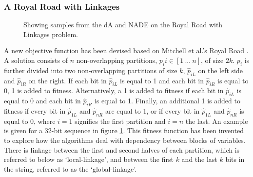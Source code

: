 \documentclass[twoside]{article}
\begin{document}
\subsubsection{A Royal Road with Linkages}
\begin{figure}[t!]
\centering
{}
\caption[Optional caption for list of figures]{Showing samples from the dA and NADE on the Royal Road with Linkages problem.}
  \label{fig:churchillroadexample}
\end{figure}


A new objective function has been devised based on Mitchell et al.'s Royal Road \citep{mitchell1992royal}. A solution consists of \(n\) non-overlapping partitions, \(p_i i\in{[1\ ... \ n]}\), of size \(2k\). \(p_i\) is further divided into two non-overlapping partitions of size \(k\), \(\hat{p}_{iL}\) on the left side and \(\hat{p}_{iR}\) on the right. If each bit in \(\hat{p}_{iL}\) is equal to 1 and each bit in \(\hat{p}_{iR}\) is equal to 0, 1 is added to fitness. Alternatively, a 1 is added to fitness if each bit in \(\hat{p}_{iL}\) is equal to 0 and each bit in \(\hat{p}_{iR}\) is equal to 1. Finally, an additional 1 is added to fitness if every bit in \(\hat{p}_{1L}\) and \(\hat{p}_{nR}\) are equal to 1, or if every bit in \(\hat{p}_{1L}\) and \(\hat{p}_{nR}\) is equal to 0, where \(i=1\) signifies the first partition and \(i=n\) the last. An example is given for a 32-bit sequence in figure \ref{fig:churchillroadexample}. This fitness function has been invented to explore how the algorithms deal with dependency between blocks of variables. There is linkage between the first and second halves of each partition, which is referred to below as `local-linkage', and between the first \(k\) and the last \(k\) bits in the string, referred to as the `global-linkage'.
\end{document}
